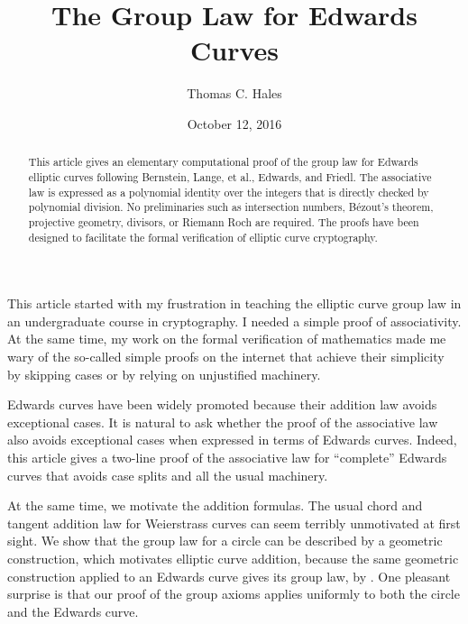 \documentclass[12pt]{article}
\title{The Group Law for Edwards Curves}
\author{Thomas C. Hales}
\date{October 12, 2016}
\begin{document}
\maketitle

\begin{abstract} 
  This article gives an elementary computational proof of the group
  law for Edwards elliptic curves following  Bernstein, Lange, et al.,
  Edwards, and Friedl.  The associative law is expressed as a polynomial
  identity over the integers that is directly checked by polynomial division.
  No preliminaries such as intersection numbers, 
  B\'ezout's theorem, projective geometry, divisors,
  or Riemann Roch are required.  The proofs have been designed
  to facilitate the formal verification of elliptic curve cryptography.
\end{abstract}

\baselineskip
{}\baselineskip

\newenvironment{blockquote}{%
  \par%
  \medskip%
  \baselineskip=0.7\baselineskip%
  \leftskip=2em\rightskip=2em%
  \noindent\ignorespaces}{%
  \par\medskip}

This article started with my frustration in teaching the elliptic curve group law
 in an undergraduate course in cryptography.  I needed
a simple proof of associativity.  At the same time, my work on the
formal verification of mathematics made me wary of the so-called simple proofs 
on the internet that achieve their simplicity by skipping cases or by relying on
unjustified machinery.  

Edwards curves have been widely promoted because their addition law
avoids exceptional cases.  It is natural to ask whether the proof of
the associative law also avoids exceptional cases when expressed in
terms of Edwards curves.  Indeed, this article gives a two-line proof
of the associative law for ``complete'' Edwards curves that avoids
case splits and all the usual machinery.

At the same time, we motivate the addition formulas.  The usual chord
and tangent addition law for Weierstrass curves can seem terribly
unmotivated at first sight.  We show that the group law for a circle
can be described by a geometric construction, which
motivates elliptic curve addition, because the same geometric
construction applied to an Edwards curve gives its group law, by
\cite{arene2011faster}.  One pleasant surprise is that our proof of
the group axioms applies uniformly to both the circle and the Edwards
curve.
\end{document}
